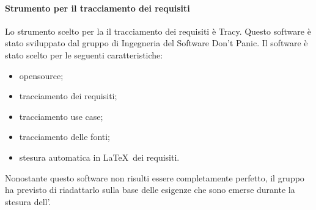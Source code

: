 \documentclass[../NormeProgetto.tex]{subfiles}
\begin{document}
			\paragraph{Strumento per il tracciamento dei requisiti}
			Lo strumento scelto per la il tracciamento dei requisiti è Tracy. Questo software è stato sviluppato dal gruppo di Ingegneria del Software Don't Panic. Il software è stato scelto per le seguenti caratteristiche:
			\begin{itemize}
				\item opensource;
				\item tracciamento dei requisiti;
				\item tracciamento use case;
				\item tracciamento delle fonti;
				\item stesura automatica in \LaTeX\ dei requisiti.
			\end{itemize}
			Nonostante questo software non risulti essere completamente perfetto, il gruppo ha previsto di riadattarlo sulla base delle esigenze che sono emerse durante la stesura dell'\analisideirequisiti.
			
\end{document}
